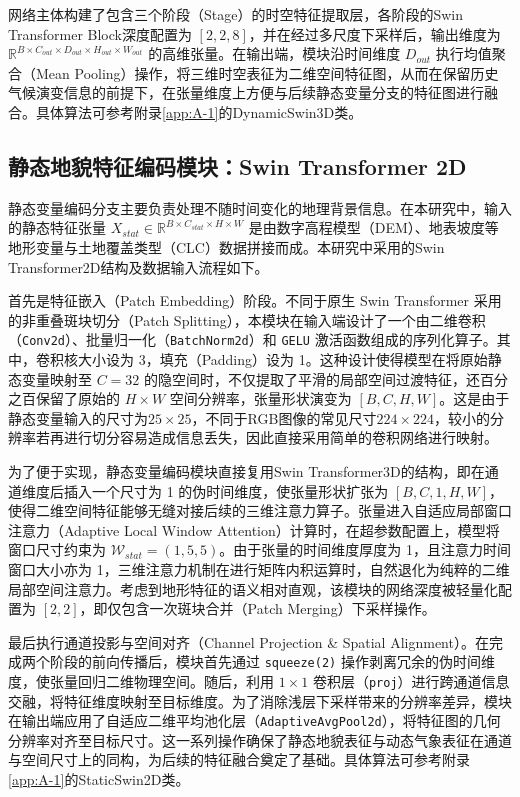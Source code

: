 网络主体构建了包含三个阶段（Stage）的时空特征提取层，各阶段的Swin Transformer Block深度配置为 $[2, 2, 8]$，并在经过多尺度下采样后，输出维度为 $\mathbb{R}^{B \times C_{out} \times D_{out} \times H_{out} \times W_{out}}$ 的高维张量。在输出端，模块沿时间维度 $D_{out}$ 执行均值聚合（Mean Pooling）操作，将三维时空表征为二维空间特征图，从而在保留历史气候演变信息的前提下，在张量维度上方便与后续静态变量分支的特征图进行融合。具体算法可参考附录\ref{app:A-1}的DynamicSwin3D类。

\subsection{静态地貌特征编码模块：Swin Transformer 2D}
\label{sec:3-3-2}
静态变量编码分支主要负责处理不随时间变化的地理背景信息。在本研究中，输入的静态特征张量 $X_{stat} \in \mathbb{R}^{B \times C_{stat} \times H \times W}$ 是由数字高程模型（DEM）、地表坡度等地形变量与土地覆盖类型（CLC）数据拼接而成。本研究中采用的Swin Transformer2D结构及数据输入流程如下。

首先是特征嵌入（Patch Embedding）阶段。不同于原生 Swin Transformer 采用的非重叠斑块切分（Patch Splitting），本模块在输入端设计了一个由二维卷积（\texttt{Conv2d}）、批量归一化（\texttt{BatchNorm2d}）和 \texttt{GELU} 激活函数组成的序列化算子。其中，卷积核大小设为 3，填充（Padding）设为 1。这种设计使得模型在将原始静态变量映射至 $C=32$ 的隐空间时，不仅提取了平滑的局部空间过渡特征，还百分之百保留了原始的 $H \times W$ 空间分辨率，张量形状演变为 $[B, C, H, W]$。这是由于静态变量输入的尺寸为$25\times 25$，不同于RGB图像的常见尺寸$224\times 224$，较小的分辨率若再进行切分容易造成信息丢失，因此直接采用简单的卷积网络进行映射。

为了便于实现，静态变量编码模块直接复用Swin Transformer3D的结构，即在通道维度后插入一个尺寸为 1 的伪时间维度，使张量形状扩张为 $[B, C, 1, H, W]$，使得二维空间特征能够无缝对接后续的三维注意力算子。张量进入自适应局部窗口注意力（Adaptive Local Window Attention）计算时，在超参数配置上，模型将窗口尺寸约束为 $\mathcal{W}_{stat}=(1, 5, 5)$。由于张量的时间维度厚度为 1，且注意力时间窗口大小亦为 1，三维注意力机制在进行矩阵内积运算时，自然退化为纯粹的二维局部空间注意力。考虑到地形特征的语义相对直观，该模块的网络深度被轻量化配置为 $[2, 2]$，即仅包含一次斑块合并（Patch Merging）下采样操作。

最后执行通道投影与空间对齐（Channel Projection \& Spatial Alignment）。在完成两个阶段的前向传播后，模块首先通过 \texttt{squeeze(2)} 操作剥离冗余的伪时间维度，使张量回归二维物理空间。随后，利用 $1 \times 1$ 卷积层（\texttt{proj}）进行跨通道信息交融，将特征维度映射至目标维度。为了消除浅层下采样带来的分辨率差异，模块在输出端应用了自适应二维平均池化层（\texttt{AdaptiveAvgPool2d}），将特征图的几何分辨率对齐至目标尺寸。这一系列操作确保了静态地貌表征与动态气象表征在通道与空间尺寸上的同构，为后续的特征融合奠定了基础。具体算法可参考附录\ref{app:A-1}的StaticSwin2D类。


